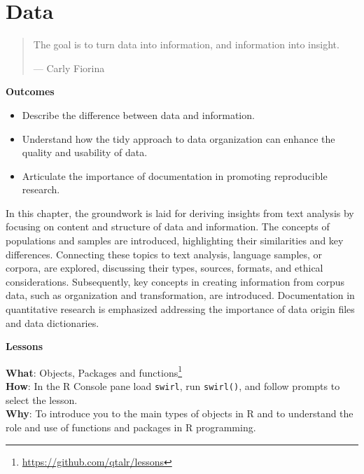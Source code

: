 \documentclass[
  letterpaper,
  DIV=11,
  numbers=noendperiod]{scrreprt}
\providecommand{\tightlist}{%
  \setlength{\itemsep}{0pt}\setlength{\parskip}{0pt}}\usepackage{longtable,booktabs,array}
\theoremstyle{definition}
\theoremstyle{remark}
\DeclareRobustCommand{\href}[2]{#2\footnote{\url{#1}}}
\begin{document}
\chapter{Data}\label{sec-understanding-data}

\begin{quote}
The goal is to turn data into information, and information into insight.

--- Carly Fiorina
\end{quote}

\begin{tcolorbox}[enhanced jigsaw, leftrule=.75mm, colframe=quarto-callout-color-frame, colback=white, rightrule=.15mm, opacityback=0, arc=.35mm, breakable, bottomrule=.15mm, left=2mm, toprule=.15mm]

\textbf{ Outcomes}

\begin{itemize}
\tightlist
\item
  Describe the difference between data and information.
\item
  Understand how the tidy approach to data organization can enhance the
  quality and usability of data.
\item
  Articulate the importance of documentation in promoting reproducible
  research.
\end{itemize}

\end{tcolorbox}

In this chapter, the groundwork is laid for deriving insights from text
analysis by focusing on content and structure of data and information.
The concepts of populations and samples are introduced, highlighting
their similarities and key differences. Connecting these topics to text
analysis, language samples, or corpora, are explored, discussing their
types, sources, formats, and ethical considerations. Subsequently, key
concepts in creating information from corpus data, such as organization
and transformation, are introduced. Documentation in quantitative
research is emphasized addressing the importance of data origin files
and data dictionaries.

\begin{tcolorbox}[enhanced jigsaw, leftrule=.75mm, colframe=quarto-callout-color-frame, colback=white, rightrule=.15mm, opacityback=0, arc=.35mm, breakable, bottomrule=.15mm, left=2mm, toprule=.15mm]

\textbf{ Lessons}

\textbf{What}: \href{https://github.com/qtalr/lessons}{Objects, Packages
and functions}\\
\textbf{How}: In the R Console pane load \texttt{swirl}, run
\texttt{swirl()}, and follow prompts to select the lesson.\\
\textbf{Why}: To introduce you to the main types of objects in R and to
understand the role and use of functions and packages in R programming.

\end{tcolorbox}
\end{document}
